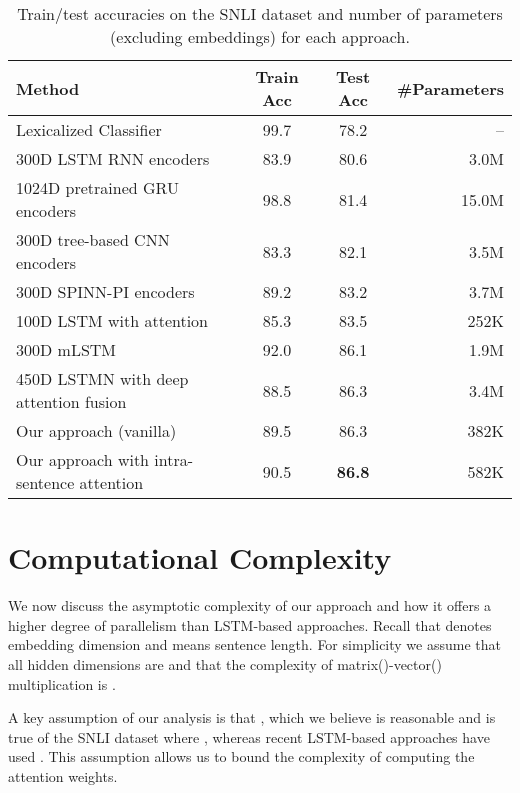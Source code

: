 \documentclass[11pt,letterpaper]{article}
\begin{document}
\begin{table*}[!tbp]
\begin{center}
\begin{tabular}{lccr}
\toprule
Method & Train Acc & Test Acc & \#Parameters \\
\midrule
Lexicalized Classifier \cite{bowman2015large} & 99.7 & 78.2 & --  \\
\midrule
300D LSTM RNN encoders \cite{bowman2016fast} & 83.9 & 80.6 & 3.0M \\
1024D pretrained GRU encoders \cite{vendrov2015order} & 98.8 & 81.4 & 15.0M \\
300D tree-based CNN encoders \cite{mou2015recognizing} & 83.3 & 82.1 & 3.5M \\
300D SPINN-PI encoders \cite{bowman2016fast} & 89.2 & 83.2 &  3.7M \\
\midrule
100D LSTM with attention \cite{rocktaschel2015reasoning} & 85.3 & 83.5 & 252K \\
300D mLSTM \cite{wang2015learning} & 92.0 & 86.1 & 1.9M \\
450D LSTMN with deep attention fusion \cite{cheng2016long} & 88.5 & 86.3 & 3.4M \\
\midrule
Our approach (vanilla)  & 89.5 & 86.3 & 382K \\
Our approach with intra-sentence attention & 90.5 & \textbf{86.8} & 582K \\
\bottomrule
\end{tabular}
\end{center}
\caption{Train/test accuracies on the SNLI dataset and number of parameters (excluding embeddings) for each approach.}
\label{table:snli-results}
\vspace{-0.4cm}
\end{table*}

\vspace{-0.1cm}
\section{Computational Complexity}
\label{sec:complexity}
\vspace{-0.1cm}

We now discuss the asymptotic complexity of our approach and how it offers a higher degree of parallelism than LSTM-based approaches.
Recall that  denotes embedding dimension and  means sentence length. For simplicity we assume that all hidden dimensions are  and that the complexity of matrix()-vector() multiplication is .

A key assumption of our analysis is that , which we believe is reasonable and is true of the SNLI dataset \cite{bowman2015large} where , whereas recent LSTM-based approaches have used . This assumption allows us to bound the complexity of computing the  attention weights.
\end{document}

